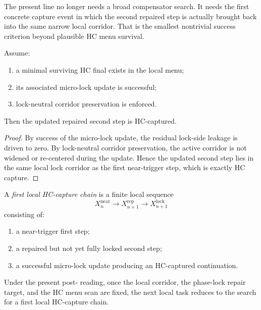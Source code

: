 \begin{remark}
\label{rem:why-capture-is-the-right-next-target}
The present line no longer needs a broad compensator search. It needs the first concrete capture event in which the second repaired step is actually brought back into the same narrow local corridor. That is the smallest nontrivial success criterion beyond plausible HC menu survival.
\end{remark}

\begin{lemma}
\label{lem:minimal-hc-lock-step-yields-local-capture}
Assume:
\begin{enumerate}[leftmargin=2em,label=(\alph*)]
 \item a minimal surviving HC final exists in the local menu;
 \item its associated micro-lock update is successful;
 \item lock-neutral corridor preservation is enforced.
\end{enumerate}
Then the updated repaired second step is HC-captured.
\end{lemma}

\begin{proof}
By success of the micro-lock update, the residual lock-side leakage is driven to zero. By lock-neutral corridor preservation, the active corridor is not widened or re-centered during the update. Hence the updated second step lies in the same local lock corridor as the first near-trigger step, which is exactly HC capture.
\end{proof}

\begin{definition}
\label{def:first-local-hc-capture-chain}
A \emph{first local HC-capture chain} is a finite local sequence
\[
 X_n^{\mathrm{near}}
 \to
 X_{n+1}^{\mathrm{rep}}
 \to
 X_{n+1}^{\mathrm{lock}}
\]
consisting of:
\begin{enumerate}[leftmargin=2em,label=(\roman*)]
 \item a near-trigger first step;
 \item a repaired but not yet fully locked second step;
 \item a successful micro-lock update producing an HC-captured continuation.
\end{enumerate}
\end{definition}

\begin{proposition}
\label{prop:current-local-line-reduces-to-hc-capture-chain-search}
Under the present post- reading, once the local corridor, the phase-lock repair target, and the HC menu scan are fixed, the next local task reduces to the search for a first local HC-capture chain.
\end{proposition}

